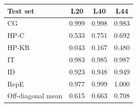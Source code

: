 \begin{tabular}{lccc}
\toprule
Test set & L20 & L40 & L44 \\
\midrule
CG & 0.999 & 0.998 & 0.983 \\
HP-C & 0.533 & 0.751 & 0.692 \\
HP-KR & 0.043 & 0.167 & 0.480 \\
IT & 0.983 & 0.985 & 0.987 \\
ID & 0.923 & 0.948 & 0.949 \\
RepE & 0.977 & 0.999 & 1.000 \\
\midrule
Off-diagonal mean & 0.615 & 0.663 & 0.708 \\
\bottomrule
\end{tabular}